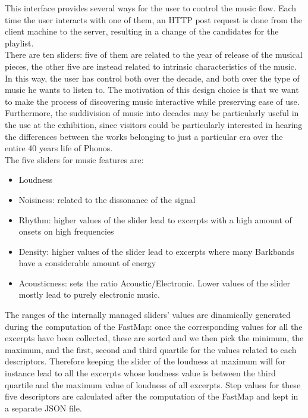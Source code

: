 This interface provides several ways for the user to control the music flow. Each time the user interacts with one of them, an HTTP post request is done from the client machine to the server, resulting in a change of the candidates for the playlist. \\
There are ten sliders: five of them are related to the year of release of the musical pieces, the other five are instead related to intrinsic characteristics of the music. In this way, the user has control both over the decade, and both over the type of music he wants to listen to. The motivation of this design choice is that we want to make the process of discovering music interactive while preserving ease of use. Furthermore, the suddivision of music into decades may be particularly useful in the use at the exhibition, since visitors could be particularly interested in hearing the differences between the works belonging to just a particular era over the entire 40 years life of Phonos. \\The five sliders for music features are:
\begin{itemize}
\item Loudness
\item Noisiness: related to the dissonance of the signal
\item Rhythm: higher values of the slider lead to excerpts with a high amount of onsets on high frequencies
\item Density: higher values of the slider lead to excerpts where many Barkbands have a considerable amount of energy
\item Acousticness: sets the ratio Acoustic/Electronic. Lower values of the slider mostly lead to purely electronic music.
\end{itemize}
The ranges of the internally managed sliders' values are dinamically generated during the computation of the FastMap: once the corresponding values for all the excerpts have been collected, these are sorted and we then pick the minimum, the maximum, and the first, second and third quartile for the values related to each descriptors. Therefore keeping the slider of the loudness at maximum will for instance lead to all the excerpts whose loudness value is between the third quartile and the maximum value of loudness of all excerpts. Step values for these five descriptors are calculated after the computation of the FastMap and kept in a separate JSON file. \\
